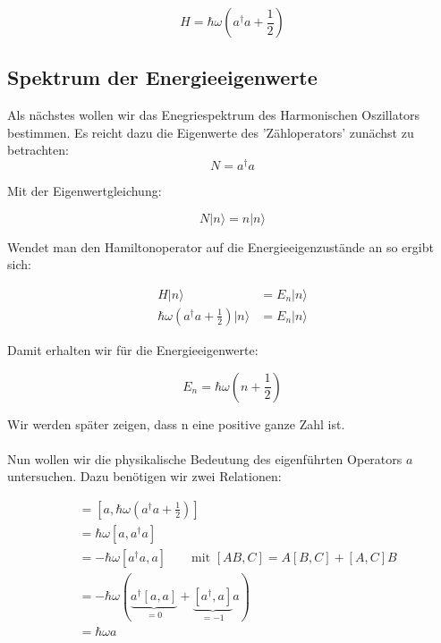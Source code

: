 \begin{equation}
  \label{eq:11}
  \boxed{ H = \hbar\omega\left(a^\dagger a + \frac{1}{2}\right) }
\end{equation}

\subsection*{Spektrum der Energieeigenwerte}

Als nächstes wollen wir das Enegriespektrum des Harmonischen Oszillators bestimmen. Es reicht dazu die Eigenwerte des 'Zähloperators' zunächst zu betrachten:
\begin{equation}
  \label{eq:12}
  N = a^\dagger a
\end{equation}

Mit der Eigenwertgleichung:

\begin{equation}
  \label{eq:13}
  N|n\rangle  = n|n\rangle 
\end{equation}

Wendet man den Hamiltonoperator auf die Energieeigenzustände an so ergibt sich:

\begin{align}
  \label{eq:14}
  H|n\rangle &=E_n|n\rangle\\
 \hbar\omega\left(a^\dagger a + \frac{1}{2}\right)|n\rangle &= E_n|n\rangle 
\end{align}

Damit erhalten wir für die Energieeigenwerte:

\begin{equation}
  \label{eq:15}
  \boxed{E_n = \hbar\omega\left(n + \frac{1}{2}\right) }
\end{equation}

Wir werden später zeigen, dass n eine positive ganze Zahl ist.\\
\\
Nun wollen wir die physikalische Bedeutung des eigenführten Operators \(a\) untersuchen. Dazu benötigen wir zwei Relationen:

\begin{align}
  [a,H] &= [a,\hbar\omega(a^\dagger a +\frac{1}{2})]  \\
&= \hbar\omega[a,a^\dagger a ]  \\
&=-\hbar\omega[a^\dagger a,a] \qquad \text{mit }[AB,C]=A[B,C]+[A,C]B \\
&=-\hbar\omega(\underbrace{a^\dagger[a,a]}_{=0}+\underbrace{[a^\dagger,a]}_{=-1}a)\\
&=\hbar\omega a \label{eq:16}
\end{align}

